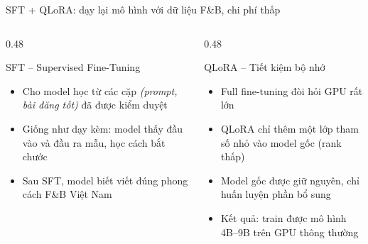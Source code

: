 \begin{frame}[t]{SFT + QLoRA: dạy lại mô hình với dữ liệu F\&B, chi phí thấp}
  \begin{columns}[T,onlytextwidth]
    \begin{column}{0.48\textwidth}
      \begin{block}{SFT -- Supervised Fine-Tuning}
        \small
        \begin{itemize}
          \item Cho model học từ các cặp \textit{(prompt, bài đăng tốt)} đã được kiểm duyệt
          \item Giống như dạy kèm: model thấy đầu vào và đầu ra mẫu, học cách bắt chước
          \item Sau SFT, model biết viết đúng phong cách F\&B Việt Nam
        \end{itemize}
      \end{block}
    \end{column}
    \begin{column}{0.48\textwidth}
      \begin{block}{QLoRA -- Tiết kiệm bộ nhớ}
        \small
        \begin{itemize}
          \item Full fine-tuning đòi hỏi GPU rất lớn
          \item QLoRA chỉ thêm một lớp tham số nhỏ vào model gốc (rank thấp)
          \item Model gốc được giữ nguyên, chỉ huấn luyện phần bổ sung
          \item Kết quả: train được mô hình 4B--9B trên GPU thông thường
        \end{itemize}
      \end{block}
    \end{column}
  \end{columns}

  \vspace{0.5cm}
  \centering
\end{frame}
